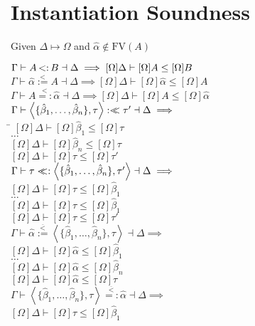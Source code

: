 \documentclass{article}
\newcommand{\st}{\ensuremath{\hspace{-1px}<:\hspace{-1px}}}
\newcommand{\alphahat}{\hat{\alpha}}
\newcommand{\betahat}{\hat{\beta}}
\newcommand{\instr}{\overset{<}{=:}}
\newcommand{\instl}{\overset{<}{:=}}
\newcommand{\sigbndl}{:<\hspace{-5px}<}
\newcommand{\sigbndr}{<\hspace{-5px}<:}
\newcommand{\siginstr}{\overset{\overline{<}}{=:}}
\newcommand{\siginstl}{\overset{\overline{<}}{:=}}
\newcommand{\pair}[2]{\left<#1,#2\right>}
\begin{document}
\section{Instantiation Soundness}

Given $\Delta \mapsto \Omega$ and $\alphahat\not\in\text{FV}(A)$
\begin{tabbing}
$\Gamma \vdash A \st B \dashv \Delta \implies [\Omega]\Delta \vdash [\Omega]A \leq [\Omega]B$\\
$\Gamma \vdash \alphahat \instl A \dashv \Delta \implies [\Omega]\Delta \vdash [\Omega]\alphahat \leq [\Omega]A$\\
$\Gamma \vdash  A \instr \alphahat \dashv \Delta \implies [\Omega]\Delta \vdash [\Omega]A \leq [\Omega]\alphahat$\\
$\Gamma \vdash \pair{\{\betahat_1,\ldots,\betahat_n\}}{\tau} \sigbndl \tau' \dashv \Delta \implies$\\
\hspace{1em}\= $[\Omega]\Delta \vdash [\Omega]\betahat_1 \leq [\Omega]\tau$\\
\> $\ldots$\\
\> $[\Omega]\Delta \vdash [\Omega]\betahat_n \leq [\Omega]\tau$\\
\> $[\Omega]\Delta \vdash [\Omega]\tau \leq [\Omega]\tau'$\\
$\Gamma \vdash \tau \sigbndr \pair{\{\betahat_1,\ldots,\betahat_n\}}{\tau'} \dashv \Delta \implies$\\
\> $[\Omega]\Delta \vdash [\Omega]\tau \leq [\Omega]\betahat_1$\\
\> $\ldots$\\
\> $[\Omega]\Delta \vdash [\Omega]\tau \leq [\Omega]\betahat_1$\\
\> $[\Omega]\Delta \vdash [\Omega]\tau \leq [\Omega]\tau'$\\
$\Gamma \vdash \alphahat \siginstl \pair{\{\betahat_1,\ldots,\betahat_n\}}{\tau} \dashv \Delta \implies$\\
\> $[\Omega]\Delta \vdash [\Omega]\alphahat \leq [\Omega]\betahat_1$\\
\> $\ldots$\\
\> $[\Omega]\Delta \vdash [\Omega]\alphahat \leq [\Omega]\betahat_n$\\
\> $[\Omega]\Delta \vdash [\Omega]\alphahat \leq [\Omega]\tau$\\
$\Gamma \vdash \pair{\{\betahat_1,\ldots,\betahat_n\}}{\tau} \siginstr \alphahat \dashv \Delta \implies$\\
\> $[\Omega]\Delta \vdash [\Omega]\tau \leq [\Omega]\betahat_1$\\

\end{tabbing}
\end{document}
